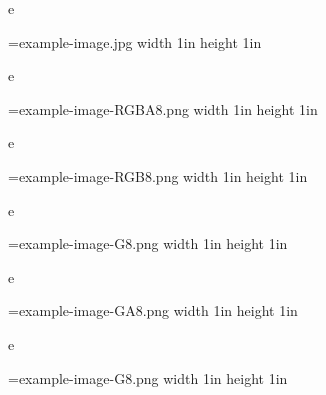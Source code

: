 e%

\HINTimage=example-image.jpg width 1in height 1in \relax

e%

\HINTimage=example-image-RGBA8.png width 1in height 1in \relax

e%

\HINTimage=example-image-RGB8.png width 1in height 1in \relax

e%

\HINTimage=example-image-G8.png width 1in height 1in \relax 

e%

\HINTimage=example-image-GA8.png width 1in height 1in \relax

e%

\HINTimage=example-image-G8.png width 1in height 1in \relax

\vfill
\bye
